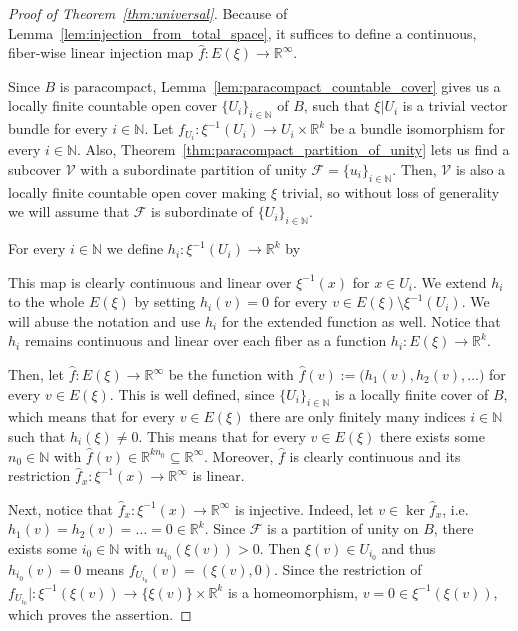 \begin{proof}[Proof of Theorem~\ref{thm:universal}] Because of Lemma~\ref{lem:injection_from_total_space}, it suffices to define a continuous, fiber-wise linear injection map $\hat{f}:E(\xi)\to\mathbb{R}^{\infty}$.

Since $B$ is paracompact, Lemma~\ref{lem:paracompact_countable_cover} gives us a locally finite countable open cover $\{U_i\}_{i\in\mathbb{N}}$ of $B$, such that $\xi|U_i$ is a trivial vector bundle for every $i\in\mathbb{N}$. Let $f_{U_i}:\xi^{-1}(U_i)\to U_i\times\mathbb{R}^k$ be a bundle isomorphism for every $i\in\mathbb{N}$. Also, Theorem~\ref{thm:paracompact_partition_of_unity} lets us find a subcover $\mathcal{V}$ with a subordinate partition of unity $\mathcal{F}=\{u_i\}_{i\in\mathbb{N}}$. Then, $\mathcal{V}$ is also a locally finite countable open cover making $\xi$ trivial, so without loss of generality we will assume that $\mathcal{F}$ is subordinate of $\{U_i\}_{i\in\mathbb{N}}$.

For every $i\in\mathbb{N}$ we define $h_i:\xi^{-1}(U_i)\to\mathbb{R}^k$ by
\begin{center}
\end{center}
This map is clearly continuous and linear over $\xi^{-1}(x)$ for $x\in U_i$. We extend $h_i$ to the whole $E(\xi)$ by setting $h_i(v)=0$ for every $v\in E(\xi)\setminus\xi^{-1}(U_i)$. We will abuse the notation and use $h_i$ for the extended function as well. Notice that $h_i$ remains continuous and linear over each fiber as a function $h_i:E(\xi)\to\mathbb{R}^k$.

Then, let $\hat{f}:E(\xi)\to\mathbb{R}^{\infty}$ be the function with $\hat{f}(v):=\big(h_1(v),h_2(v),\ldots\big)$ for every $v\in E(\xi)$. This is well defined, since $\{U_i\}_{i\in\mathbb{N}}$ is a locally finite cover of $B$, which means that for every $v\in E(\xi)$ there are only finitely many indices $i\in\mathbb{N}$ such that $h_i(\xi)\neq0$. This means that for every $v\in E(\xi)$ there exists some $n_0\in\mathbb{N}$ with $\hat{f}(v)\in\mathbb{R}^{kn_0}\subseteq\mathbb{R}^{\infty}$. Moreover, $\hat{f}$ is clearly continuous and its restriction $\hat{f}_x:\xi^{-1}(x)\to\mathbb{R}^{\infty}$ is linear.

Next, notice that $\hat{f}_x:\xi^{-1}(x)\to\mathbb{R}^{\infty}$ is injective. Indeed, let $v\in\ker\hat{f}_x$, i.e. $h_1(v)=h_2(v)=\ldots=0\in\mathbb{R}^k$. Since $\mathcal{F}$ is a partition of unity on $B$, there exists some $i_0\in\mathbb{N}$ with $u_{i_0}(\xi(v))>0$. Then $\xi(v)\in U_{i_0}$ and thus $h_{i_0}(v)=0$ means $f_{U_{i_0}}(v)=(\xi(v),0)$. Since the restriction of $f_{U_{i_0}}|:\xi^{-1}(\xi(v))\to\{\xi(v)\}\times\mathbb{R}^k$ is a homeomorphism, $v=0\in\xi^{-1}(\xi(v))$, which proves the assertion.
\end{proof}

